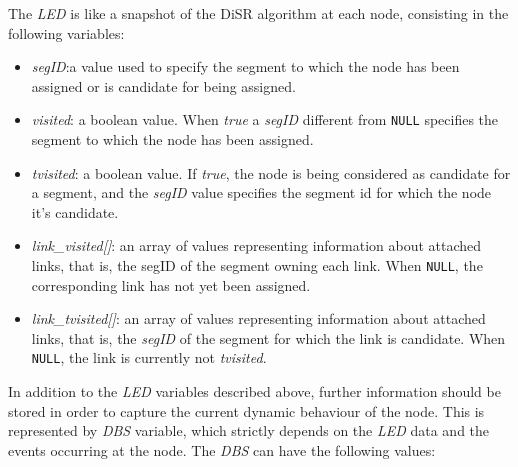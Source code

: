 The \emph{LED} is like a snapshot of the DiSR algorithm at each node,
consisting in the following variables:

\begin{itemize}
\item{\emph{segID}}:a value used to specify the segment to which the
node has been assigned or is candidate for being assigned.
\item{\emph{visited}}: a boolean value. When \emph{true}
a \emph{segID} different from \texttt{NULL} specifies the segment 
to which the node has been assigned. 


\item{\emph{tvisited}}: a boolean value. If \emph{true}, the node is
being considered as candidate for a segment, and the \emph{segID} value
specifies the segment id for which the node it's candidate. 
\item{\emph{link\_visited[]}}: an array
of values representing information about attached links, that is, the
segID of the segment owning each link. When \texttt{NULL}, the corresponding link has not yet been
assigned.
\item{\emph{link\_tvisited[]}}: an array of
values representing information about attached links, that is, the \emph{segID} of
the segment for which the link is candidate. When \texttt{NULL}, the link is
currently not \emph{tvisited}.  
\end{itemize}

In addition to the \emph{LED} variables described above, further
information should be stored in order to capture the current dynamic
behaviour of the node. This is represented by \emph{DBS} variable,
which strictly depends on the \emph{LED} data and the events occurring
at the node. The \emph{DBS} can have the following values:

